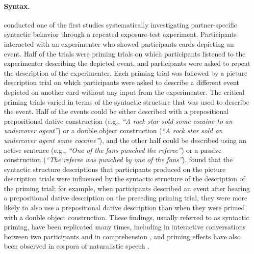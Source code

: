 \paragraph{Syntax.} \textcite{Bock1986} conducted one of the first studies systematically investigating partner-specific syntactic behavior through a repeated
exposure-test experiment. Participants interacted with an experimenter who showed participants cards depicting an event.  Half of the trials were priming trials on which
 participants listened to the experimenter describing the depicted event, and participants were asked to repeat the description of the experimenter. 
 Each priming trial was followed by a picture description trial on which participants were asked to describe a different event depicted on another card without any input from the experimenter.
The critical priming trials varied in terms of the syntactic structure that was used to describe the event. Half of the events could be either described with a prepositional
 prepositional dative construction (e.g., \textit{``A rock star
sold some cocaine to an undercover agent''})  or a double object construction (\textit{``A rock star sold an undercover agent some cocaine''}), and the other half could be
described using an active sentence (e.g., \textit{``One of the fans punched the referee''}) or a passive construction (\textit{``The referee was punched by one of the fans''}).
\cite{Bock1986} found that the syntactic structure descriptions that participants produced on the picture description trials were influenced by the syntactic structure of the description
of the priming trial; for example, when participants described an event after hearing a prepositional dative description on the preceding priming trial, they were more likely to also 
use a prepositional dative description than when they were primed with a double object construction. These findings, usually referred to as syntactic priming, have been 
replicated many times, including in interactive conversations between two participants \cite{Branigan2000} and in comprehension , 
and priming effects have also been observed in corpora of naturalistic speech . 


